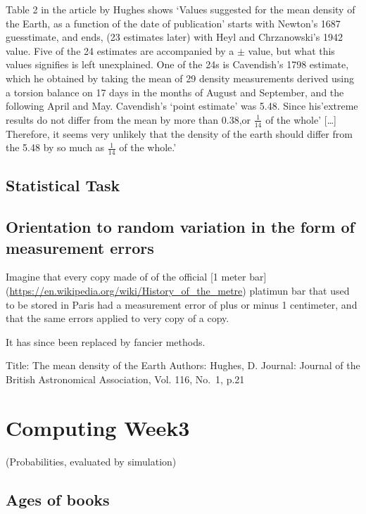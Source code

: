\documentclass[]{book}
\begin{document}
Table 2 in the article by Hughes shows `Values suggested for the mean density of the Earth, as a function of the date of publication' starts with Newton's 1687 guesstimate, and ends, (23 estimates later) with Heyl and Chrzanowski's 1942 value.
Five of the 24 estimates are accompanied by a \(\pm\) value, but what this values signifies is left unexplained. One of the 24s is Cavendish's 1798 estimate, which he obtained by taking the mean of 29 density measurements derived using a torsion balance on 17 days in the months of August and September, and the following April and May. Cavendish's `point estimate' was 5.48. Since his'extreme results do not differ from the mean by more than 0.38,or \(\frac{1}{14}\) of the whole' {[}\ldots{}{]} Therefore, it seems very unlikely that the density of the earth should differ from the 5.48 by so much as \(\frac{1}{14}\) of the whole.'

\hypertarget{statistical-task-1}{%
\section{Statistical Task}\label{statistical-task-1}}

\hypertarget{orientation-to-random-variation-in-the-form-of-measurement-errors}{%
\section{Orientation to random variation in the form of measurement errors}\label{orientation-to-random-variation-in-the-form-of-measurement-errors}}

Imagine that every copy made of of the official {[}1 meter bar{]} (\url{https://en.wikipedia.org/wiki/History_of_the_metre}) platimun bar that used to be stored in Paris had a measurement error of plus or minus 1 centimeter, and that the same errors applied to very copy of a copy.

It has since been replaced by fancier methods.

Title: The mean density of the Earth
Authors: Hughes, D.
Journal: Journal of the British Astronomical Association, Vol. 116, No.~1, p.21

\hypertarget{computing03}{%
\chapter{Computing Week3}\label{computing03}}

(Probabilities, evaluated by simulation)

\hypertarget{ages-of-books}{%
\section{Ages of books}\label{ages-of-books}}
\end{document}
